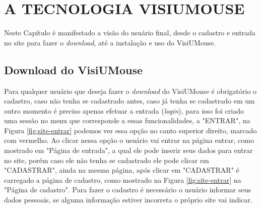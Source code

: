 


\chapter{A TECNOLOGIA VISIUMOUSE}\label{CAP-tecnologia-visiumouse}
Neste Capítulo é manifestado a visão do usuário final, desde o cadastro e entrada no site para fazer o \textit{download}, até a instalação e uso do VisiUMouse. 

\section{Download do VisiUMouse}
Para qualquer usuário que deseja fazer o \textit{download} do VisiUMouse é obrigatório o cadastro, caso não tenha se cadastrado antes, caso já tenha se cadastrado em um outro momento é preciso apenas efetuar a entrada (\textit{login}), para isso foi criado uma sessão no menu que corresponde a essas funcionalidades, a "ENTRAR", na Figura \ref{fig:site-entrar} podemos ver essa opção no canto superior direito, marcado com vermelho. Ao clicar nessa opção o usuário vai entrar na página entrar, como mostrado em "Página de entrada", a qual ele pode inserir seus dados para entrar no site, porém caso ele não tenha se cadastrado ele pode clicar em "CADASTRAR", ainda na mesma página, após clicar em "CADASTRAR" é carregado a página de cadastro, como mostrado na Figura \ref{fig:site-entrar} na "Página de cadastro". Para fazer o cadastro é necessário o usuário informar seus dados pessoais, se alguma informação estiver incorreta o próprio site vai indicar. 

